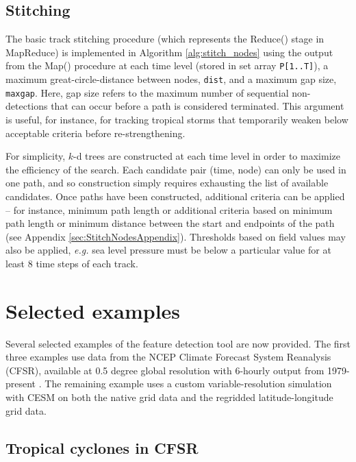 \documentclass[gmdd, hvmath, online]{copernicus_discussions}
\begin{document}
\subsection{Stitching}

The basic track stitching procedure (which represents the Reduce() stage in MapReduce) is implemented in Algorithm \ref{alg:stitch_nodes} using the output from the Map() procedure at each time level (stored in set array \texttt{P[1..T]}), a maximum great-circle-distance between nodes, \texttt{dist}, and a maximum gap size, \texttt{maxgap}.  Here, gap size refers to the maximum number of sequential non-detections that can occur before a path is considered terminated.  This argument is useful, for instance, for tracking tropical storms that temporarily weaken below acceptable criteria before re-strengthening.

For simplicity, $k$-d trees are constructed at each time level in order to maximize the efficiency of the search.  Each candidate pair (time, node) can only be used in one path, and so construction simply requires exhausting the list of available candidates.  Once paths have been constructed, additional criteria can be applied -- for instance, minimum path length or additional criteria based on minimum path length or minimum distance between the start and endpoints of the path (see Appendix \ref{sec:StitchNodesAppendix}).  Thresholds based on field values may also be applied, \textit{e.g.} sea level pressure must be below a particular value for at least 8 time steps of each track.

\section{Selected examples} \label{sec:SelectedExamples}

Several selected examples of the feature detection tool are now provided.  The first three examples use data from the NCEP Climate Forecast System Reanalysis (CFSR), available at 0.5 degree global resolution with 6-hourly output from 1979-present \citep{saha2010ncep}.  The remaining example uses a custom variable-resolution simulation with CESM \citep{zarzycki2014multidecadal} on both the native grid data and the regridded latitude-longitude grid data.

\subsection{Tropical cyclones in CFSR} \label{sec:TropicalCycloneExample}
\end{document}
